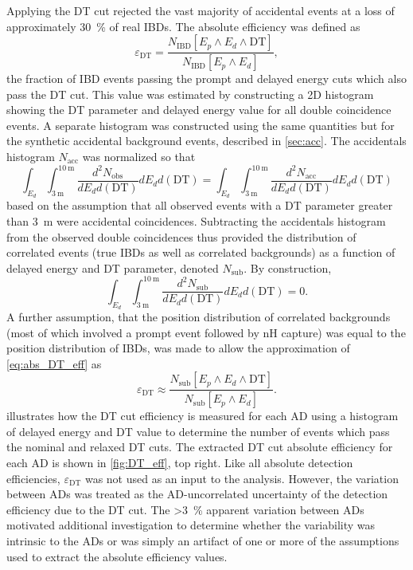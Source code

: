 Applying the DT cut rejected the vast majority of accidental events
at a loss of approximately \SI{30}{\percent} of real IBDs.
The absolute efficiency was defined as
\begin{equation}\label{eq:abs_DT_eff}
    \varepsilon_{\text{DT}} = \frac{
        N_\text{IBD}[E_p \wedge E_d \wedge \text{DT}]
    }%
    {
        N_\text{IBD}[E_p \wedge E_d]
    },
\end{equation}
the fraction of IBD events passing the prompt and delayed energy cuts
which also pass the DT cut.
This value was estimated by constructing a 2D histogram
showing the DT parameter and delayed energy value
for all double coincidence events.
A separate histogram was constructed using the same quantities
but for the synthetic accidental background events, described in \cref{sec:acc}.
The accidentals histogram $N_\text{acc}$ was normalized so that
\begin{equation}\label{eq:acc_sub_normalized}
    \int_{E_d}\int_{\SI{3}{\m}}^{\SI{10}{\m}}
    \frac{d^2N_\text{obs}}{dE_d d(\text{DT})}
    dE_d d(\text{DT})
    =
    \int_{E_d}\int_{\SI{3}{\m}}^{\SI{10}{\m}}
    \frac{d^2N_\text{acc}}{dE_d d(\text{DT})}
    dE_d d(\text{DT})
\end{equation}
based on the assumption that all observed events
with a DT parameter greater than \SI{3}{\m}
were accidental coincidences.
Subtracting the accidentals histogram from the observed double coincidences
thus provided the distribution of correlated events
(true IBDs as well as correlated backgrounds)
as a function of delayed energy and DT parameter,
denoted $N_\text{sub}$.
By construction,
\begin{equation}\label{eq:acc_sub_normalized_zero}
    \int_{E_d}\int_{\SI{3}{\m}}^{\SI{10}{\m}}
    \frac{d^2N_\text{sub}}{dE_d d(\text{DT})}
    dE_d d(\text{DT})
    = 0.
\end{equation}
A further assumption, that the position distribution of correlated backgrounds
(most of which involved a prompt event followed by nH capture)
was equal to the position distribution of IBDs,
was made to allow the approximation of \cref{eq:abs_DT_eff} as
\begin{equation}\label{eq:abs_DT_eff_approx}
    \varepsilon_{\text{DT}} \approx \frac{
        N_\text{sub}[E_p \wedge E_d \wedge \text{DT}]
    }%
    {
        N_\text{sub}[E_p \wedge E_d]
    }.
\end{equation}
 illustrates how the DT cut efficiency is measured
for each AD using a histogram of delayed energy and DT value
to determine the number of events which pass the nominal and relaxed DT cuts.
The extracted DT cut absolute efficiency for each AD is shown in
\cref{fig:DT_eff}, top right.
Like all absolute detection efficiencies,
$\varepsilon_{\text{DT}}$ was not used as an input to the \thetaot{} analysis.
However, the variation between ADs was treated as the AD-uncorrelated uncertainty
of the detection efficiency due to the DT cut.
The \SI{>3}{\percent} apparent variation between ADs
motivated additional investigation
to determine whether the variability was intrinsic to the ADs
or was simply an artifact of one or more of the assumptions
used to extract the absolute efficiency values.

